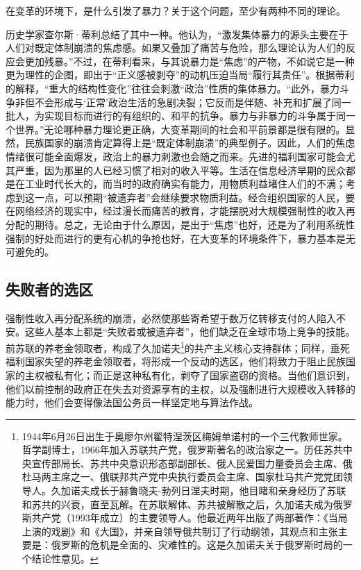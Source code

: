在变革的环境下，是什么引发了暴力？关于这个问题，至少有两种不同的理论。

历史学家查尔斯·蒂利总结了其中一种。他认为，“激发集体暴力的源头主要在于人们对既定体制崩溃的焦虑感。如果又叠加了痛苦与危险，那么理论认为人们的反应会更加残暴。”不过，在蒂利看来，与其说暴力是“焦虑”的产物，不如说它是一种更为理性的企图，即出于“正义感被剥夺”的动机压迫当局“履行其责任”。根据蒂利的解释，“重大的结构性变化”往往会刺激“政治”性质的集体暴力。“此外，暴力斗争非但不会形成与‘正常’政治生活的急剧决裂；它反而是伴随、补充和扩展了同一批人，为实现目标而进行的有组织的、和平的抗争。暴力与非暴力的斗争属于同一个世界。”无论哪种暴力理论更正确，大变革期间的社会和平前景都是很有限的。显然，民族国家的崩溃肯定算得上是“既定体制崩溃”的典型例子。因此，人们的焦虑情绪很可能全面爆发，政治上的暴力刺激也会随之而来。先进的福利国家可能会尤其严重，因为那里的人已经习惯了相对的收入平等。生活在信息经济早期的民众都是在工业时代长大的，而当时的政府确实有能力，用物质利益堵住人们的不满；考虑到这一点，可以预期“被遗弃者”会继续要求物质利益。经合组织国家的人民，要在网络经济的现实中，经过漫长而痛苦的教育，才能摆脱对大规模强制性的收入再分配的期待。总之，无论由于什么原因，是出于“焦虑”也好，还是为了利用系统性强制的好处而进行的更有心机的争抢也好，在大变革的环境条件下，暴力基本是无可避免的。

\subsection{失败者的选区}

强制性收入再分配系统的崩溃，必然使那些寄希望于数万亿转移支付的人陷入不安。这些人基本上都是“失败者或被遗弃者”，他们缺乏在全球市场上竞争的技能。前苏联的养老金领取者，构成了久加诺夫\footnote{1944年6月26日出生于奥廖尔州翟特涅茨区梅姆单诺村的一个三代教师世家。哲学副博士，1966年加入苏联共产党，俄罗斯著名的政治家之一。历任苏共中央宣传部局长、苏共中央意识形态部副部长、俄人民爱国力量委员会主席、俄杜马两主席之一、俄联邦共产党中央执行委员会主席、国家杜马共产党党团领导人。久加诺夫成长于赫鲁晓夫-勃列日涅夫时期，他目睹和亲身经历了苏联和苏共的兴衰，直至瓦解。在苏联解体、苏共被解散之后，久加诺夫成为俄罗斯共产党（1993年成立）的主要领导人。他最近两年出版了两部著作：《当局上演的戏剧》和《大国》，并亲自领导俄共制订了行动纲领，其观点和主张主要是：俄罗斯的危机是全面的、灾难性的。这是久加诺夫关于俄罗斯时局的一个结论性意见。}的共产主义核心支持群体；同样，垂死福利国家失望的养老金领取者，将形成一个反动的选区，他们将致力于阻止民族国家的主权被私有化；而正是这种私有化，剥夺了国家盗窃的资格。当他们意识到，他们以前控制的政府正在失去对资源享有的主权，以及强制进行大规模收入转移的能力时，他们会变得像法国公务员一样坚定地与算法作战。

